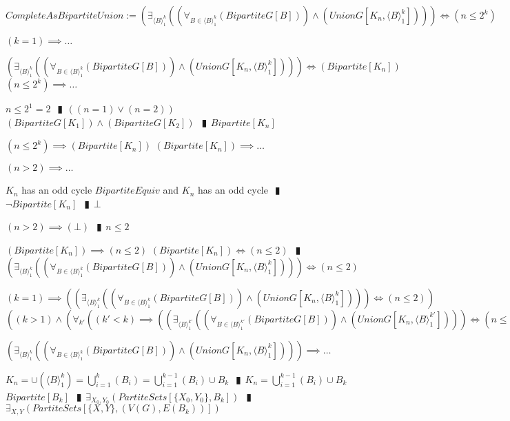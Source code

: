 \documentclass{book}
\newcommand{\abr}{:=}
\newcommand{\pipe}{$\phantom{(}\vrectangleblack\phantom{)}$}
\begin{document}
$CompleteAsBipartiteUnion \abr (\exists_{\langle B \rangle_1^k}((\forall_{B \in \langle B \rangle_1^k}(BipartiteG[B])) \land (UnionG[K_n, \langle B \rangle_1^k]))) \iff (n \leq 2^k)$
\begin{enumerate}
  \lit $(k = 1) \implies \ldots$
  \begin{enumerate}
    \lit $(\exists_{\langle B \rangle_1^k}((\forall_{B \in \langle B \rangle_1^k}(BipartiteG[B])) \land (UnionG[K_n, \langle B \rangle_1^k]))) \iff (Bipartite[K_n])$
    \lit $(n \leq 2^k) \implies \ldots$
    \begin{enumerate}
      \lit $n \leq 2^1 = 2$ \pipe $((n = 1) \lor (n = 2))$
      \lit $(BipartiteG[K_1]) \land (BipartiteG[K_2])$ \pipe $Bipartite[K_n]$
    \end{enumerate}
    \lit $(n \leq 2^k) \implies (Bipartite[K_n])$
    \lit $(Bipartite[K_n]) \implies \ldots$
    \begin{enumerate}
      \lit $(n > 2) \implies \ldots$
      \begin{enumerate}
        \lit $K_n$ has an odd cycle
        \lit $BipartiteEquiv$ and $K_n$ has an odd cycle \pipe $\lnot Bipartite[K_n]$ \pipe $\bot$
      \end{enumerate}
      \lit $(n > 2) \implies (\bot)$ \pipe $n \leq 2$
    \end{enumerate}
    \lit $(Bipartite[K_n]) \implies (n \leq 2)$
    \lit $(Bipartite[K_n]) \iff (n \leq 2)$ \pipe $(\exists_{\langle B \rangle_1^k}((\forall_{B \in \langle B \rangle_1^k}(BipartiteG[B])) \land (UnionG[K_n, \langle B \rangle_1^k]))) \iff (n \leq 2)$
  \end{enumerate}
  \lit $(k = 1) \implies ((\exists_{\langle B \rangle_1^k}((\forall_{B \in \langle B \rangle_1^k}(BipartiteG[B])) \land (UnionG[K_n, \langle B \rangle_1^k]))) \iff (n \leq 2))$
  \lit $((k > 1) \land (\forall_{k'}((k' < k) \implies ((\exists_{\langle B \rangle_1^{k'}}((\forall_{B \in \langle B \rangle_1^{k'}}(BipartiteG[B])) \land (UnionG[K_n, \langle B \rangle_1^{k'}]))) \iff (n \leq 2^{k'}))))) \implies \ldots$
  \begin{enumerate}
    \lit $(\exists_{\langle B \rangle_1^k}((\forall_{B \in \langle B \rangle_1^k}(BipartiteG[B])) \land (UnionG[K_n, \langle B \rangle_1^k]))) \implies \ldots$
    \begin{enumerate}
      \lit $K_n = \cup(\langle B \rangle_1^k) = \bigcup \limits_{i=1}^{k}(B_i) = \bigcup \limits_{i=1}^{k - 1}(B_i) \cup B_k$ \pipe $K_n = \bigcup \limits_{i=1}^{k - 1}(B_i) \cup B_k$
      \lit $Bipartite[B_k]$ \pipe $\exists_{X_0, Y_0}(PartiteSets[\{X_0, Y_0\}, B_k])$ \pipe $\exists_{X, Y}(PartiteSets[\{X, Y\}, (V(G), E(B_k))])$

\end{enumerate}
\end{enumerate}
\end{enumerate}
\end{document}
